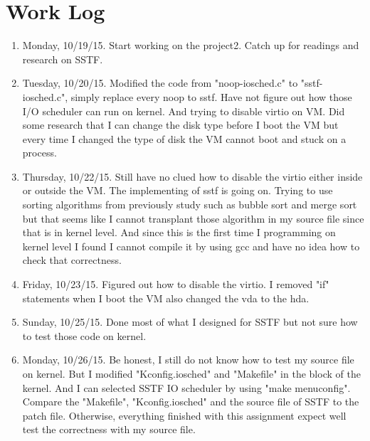 \documentclass[letterpaper,11pt,titlepage]{article}
\begin{document}
\section{Work Log}
\begin{enumerate}

\item Monday, 10/19/15. Start working on the project2. Catch up for readings and research on SSTF.

\item Tuesday, 10/20/15. Modified the code from "noop-iosched.c" to "sstf-iosched.c", simply replace every noop to sstf. 
Have not figure out how those I/O scheduler can run on kernel. And trying to disable virtio on VM. Did some research that I can change the
disk type before I boot the VM but every time I changed the type of disk the VM cannot boot and stuck on a process. 

\item Thursday, 10/22/15. Still have no clued how to disable the virtio either inside or outside the VM. The implementing of sstf is going on. 
Trying to use sorting algorithms from previously study such as bubble sort and merge sort but that seems like I cannot transplant those algorithm
in my source file since that is in kernel level. And since this is the first time I programming on kernel level I found I cannot compile it by using gcc and 
have no idea how to check that correctness.  

\item Friday, 10/23/15. Figured out how to disable the virtio. I removed "if" statements when I boot the VM also changed the vda to the hda. 

\item Sunday, 10/25/15. Done most of what I designed for SSTF but not sure how to test those code on kernel. 

\item Monday, 10/26/15. Be honest, I still do not know how to test my source file on kernel. But I modified "Kconfig.iosched" and "Makefile" in the block of the kernel. And 
I can selected SSTF IO scheduler by using "make menuconfig". Compare the "Makefile", "Kconfig.iosched" and the source file of SSTF to the patch file. Otherwise, 
everything finished with this assignment expect well test the correctness with my source file. 

\end{enumerate}
\end{document}
